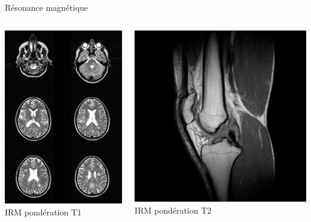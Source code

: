 \documentclass{beamer}
\begin{document}
\begin{frame}{Résonance magnétique}
\begin{columns}[T]
 \begin{column}{0.5\textwidth}
 \centering
\includegraphics[height=0.6\textheight]{images/irm_t2.jpg}\\
IRM pondération T1
 \end{column}
 \begin{column}{0.5\textwidth}
 \centering
\includegraphics[height=0.6\textheight]{images/IRM_genou_sag_2.png}\\
IRM pondération T2
 \end{column}
\end{columns} 
\end{frame}
\end{document}
